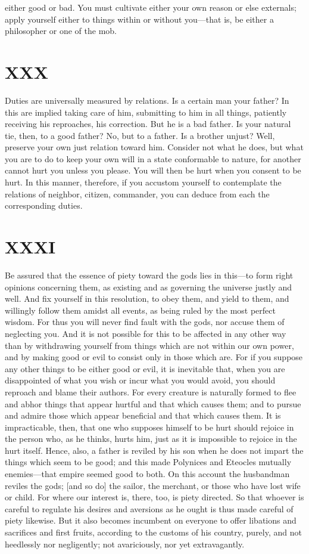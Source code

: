 \documentclass[11pt]{article}
\begin{document}
either good or bad. You must cultivate either your own reason or else externals; apply yourself either to things within or without you—that is, be either a philosopher or one of the mob.
\section*{XXX}

Duties are universally measured by relations. Is a certain man your father? In this are implied taking care of him, submitting to him in all things, patiently receiving his reproaches, his correction. But he is a bad father. Is your natural tie, then, to a good father? No, but to a father. Is a brother unjust? Well, preserve your own just relation toward him. Consider not what he does, but what you are to do to keep your own will in a state conformable to nature, for another cannot hurt you unless you please. You will then be hurt when you consent to be hurt. In this manner, therefore, if you accustom yourself to contemplate the relations of neighbor, citizen, commander, you can deduce from each the corresponding duties.
\section*{XXXI}

Be assured that the essence of piety toward the gods lies in this—to form right opinions concerning them, as existing and as governing the universe justly and well. And fix yourself in this resolution, to obey them, and yield to them, and willingly follow them amidst all events, as being ruled by the most perfect wisdom. For thus you will never find fault with the gods, nor accuse them of neglecting you. And it is not possible for this to be affected in any other way than by withdrawing yourself from things which are not within our own power, and by making good or evil to consist only in those which are. For if you suppose any other things to be either good or evil, it is inevitable that, when you are disappointed of what you wish or incur what you would avoid, you should reproach and blame their authors. For every creature is naturally formed to flee and abhor things that appear hurtful and that which causes them; and to pursue and admire those which appear beneficial and that which causes them. It is impracticable, then, that one who supposes himself to be hurt should rejoice in the person who, as he thinks, hurts him, just as it is impossible to rejoice in the hurt itself. Hence, also, a father is reviled by his son when he does not impart the things which seem to be good; and this made Polynices and Eteocles mutually enemies—that empire seemed good to both. On this account the husbandman reviles the gods; [and so do] the sailor, the merchant, or those who have lost wife or child. For where our interest is, there, too, is piety directed. So that whoever is careful to regulate his desires and aversions as he ought is thus made careful of piety likewise. But it also becomes incumbent on everyone to offer libations and sacrifices and first fruits, according to the customs of his country, purely, and not heedlessly nor negligently; not avariciously, nor yet extravagantly.
\end{document}

